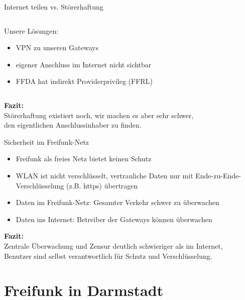 \documentclass[10pt]{beamer}
\begin{document}
\begin{frame}{Internet teilen vs. Störerhaftung}
\begin{columns}[c]
\begin{column}{8cm}
	\bigskip
	\pause
	
	Unsere Lösungen:
	\begin{itemize}
		\item VPN zu unseren Gateways
		\item eigener Anschluss im Internet nicht sichtbar
		\item FFDA hat indirekt Providerprivileg (FFRL)
	\end{itemize}
		\end{column}
	\end{columns}
	
	\vfill
	\centering
	\pause \textbf{Fazit:}\\Störerhaftung existiert noch, wir machen es aber sehr schwer,\\den eigentlichen Anschlussinhaber zu finden.

\end{frame}

\begin{frame}{Sicherheit im Freifunk-Netz}
	\begin{itemize}[<+->]
		\item Freifunk als freies Netz bietet keinen Schutz
		\item WLAN ist nicht verschlüsselt, vertrauliche Daten nur mit Ende-zu-Ende-Verschlüsselung (z.B. https) übertragen
		\vfill
		\item Daten im Freifunk-Netz: Gesamter Verkehr schwer zu überwachen
		\pause\item Daten ins Internet: Betreiber der Gateways können überwachen
	\end{itemize}
	\vfill
	\pause
	\centering
	\textbf{Fazit:}\\Zentrale Überwachung und Zensur deutlich schwieriger als im Internet, \\
	Benutzer sind selbst verantwortlich für Schutz und Verschlüsselung.
\end{frame}

\section{Freifunk in Darmstadt}
\end{document}
